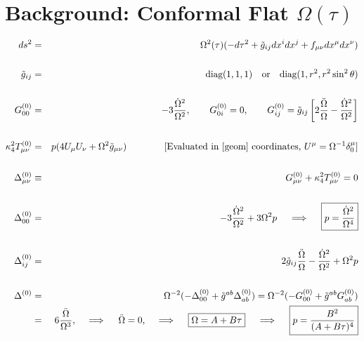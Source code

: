 \documentclass[10pt,letterpaper]{article}
\numberwithin{equation}{section}
\begin{document}
\section{Background: Conformal Flat $\Omega(\tau)$}
%
\begin{eqnarray}
	ds^2 &=& \Omega^2(\tau)(-d\tau^2 + \tilde g_{ij} dx^i dx^j + f_{\mu\nu} dx^\mu dx^\nu)
	\label{geom}
	\\ \nonumber\\
	\tilde g_{ij} &=& \text{diag}(1,1,1)\quad\text{or}\quad \text{diag}(1,r^2,r^2\sin^2\theta)
	\\ \nonumber\\
	G^{(0)}_{00}&=& -3 \frac{\dot\Omega^2}{\Omega^2},\qquad
	G^{(0)}_{0i} = 0,\qquad
	G^{(0)}_{ij} = \tilde g_{ij} \left[2\frac{\ddot\Omega}{\Omega}-\frac{\dot\Omega^2}{\Omega^2}\right]
	\\ \nonumber\\
	\kappa^2_4 T_{\mu\nu}^{(0)} &=&  p(4 U_\mu U_\nu + \Omega^2\tilde g_{\mu\nu})\qquad\qquad  \text{[Evaluated in \eqref{geom} coordinates, $U^\mu = \Omega^{-1}\delta^\mu_0$]}
	\\ \nonumber\\
	\Delta^{(0)}_{\mu\nu} &\equiv& G_{\mu\nu}^{(0)}+\kappa^2_4 T_{\mu\nu}^{(0)}=0
	\\ \nonumber\\
	\Delta^{(0)}_{00} &=& -3 \frac{\dot\Omega^2}{\Omega^2}+3\Omega^2 p\quad \implies\quad
	\boxed{ p = \frac{\dot\Omega^2}{\Omega^4}}
	\\ \nonumber\\
	\Delta^{(0)}_{ij} &=& 2\tilde g_{ij} \frac{\ddot \Omega}{\Omega} - \frac{\dot\Omega^2}{\Omega^2} +\Omega^2 p 
	\\ \nonumber\\
	\Delta^{(0)} &=& \Omega^{-2}(-\Delta^{(0)}_{00} + \tilde g^{ab}\Delta^{(0)}_{ab})  = \Omega^{-2}(-G^{(0)}_{00} + \tilde g^{ab}G^{(0)}_{ab})
	\nonumber\\
	&=& 6\frac{\ddot\Omega}{\Omega^3},\quad\implies\quad \ddot\Omega = 0,\quad\implies\quad \boxed{\Omega = A+B\tau}\quad\implies\quad \boxed{ p = \frac{B^2}{(A+B\tau)^4}}
	\label{p1}
\end{eqnarray}
%
%
%
\end{document}
